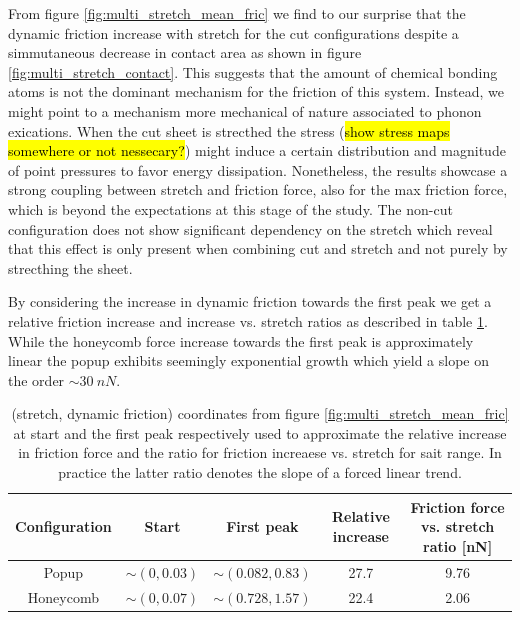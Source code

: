 From figure \ref{fig:multi_stretch_mean_fric} we find to our surprise that the
dynamic friction increase with stretch for the cut configurations despite a
simmutaneous decrease in contact area as shown in figure
\ref{fig:multi_stretch_contact}. This suggests that the amount of chemical
bonding atoms is not the dominant mechanism for the friction of this system.
Instead, we might point to a mechanism more mechanical of nature associated to
phonon exications. When the cut sheet is strecthed the stress (\hl{show stress
maps somewhere or not nessecary?}) might induce a certain distribution and
magnitude of point pressures to favor energy dissipation. Nonetheless, the
results showcase a strong coupling between stretch and friction force, also for
the max friction force, which is beyond the expectations at this stage of the
study. The non-cut configuration does not show significant dependency on the stretch which reveal that this effect is only present when combining cut and stretch and not purely by strecthing the sheet. 

By considering the increase in dynamic friction towards the first peak we get a relative friction increase and increase vs. stretch ratios as described in table \ref{tab:first_peak_stretch}. While the honeycomb force increase towards the first peak is approximately linear the popup exhibits seemingly exponential growth which yield a slope on the order $\sim \SI{30}{nN}$. 

\begin{table}[H]
  \begin{center}
  \caption{(stretch, dynamic friction) coordinates from figure \ref{fig:multi_stretch_mean_fric} at start and the first peak respectively used to approximate the relative increase in friction force and the ratio for friction increaese vs. stretch for sait range. In practice  the latter ratio denotes the slope of a forced linear trend. }
  \label{tab:first_peak_stretch}
  \begin{tabular}{ | c | c | c | c | c |} \hline
  Configuration & Start & First peak & Relative increase & Friction force vs. stretch ratio [nN]  \\ \hline
  Popup & $\sim (0, 0.03)$ & $\sim(0.082, 0.83)$ & 27.7 & 9.76  \\ \hline
  Honeycomb & $\sim (0, 0.07)$ &  $\sim (0.728, 1.57)$ & 22.4 & 2.06 \\ \hline
  \end{tabular}
  \end{center}
\end{table}

